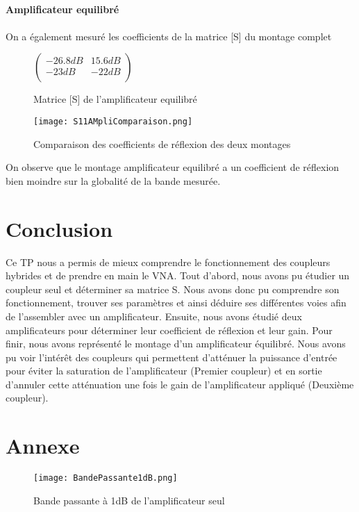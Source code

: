 \documentclass[oneside,a4paper,12pt]{article}
\begin{document}
	\paragraph{Amplificateur equilibré} \paragraph{}

	On a également mesuré les coefficients de la matrice [S] du montage complet
	
	\begin{figure}[h]
		\centering
		$
		\begin{pmatrix}
			-26.8 dB & 15.6 dB \\
			-23 dB & -22 dB \\
		\end{pmatrix}
		$
		\caption{Matrice [S] de l'amplificateur equilibré}
	\end{figure}

	\newpage
	\begin{figure}[h]
		\centering
		\texttt{[image: S11AMpliComparaison.png]}
		\caption{Comparaison des coefficients de réflexion des deux montages}
	\end{figure}

	On observe que le montage amplificateur equilibré a un coefficient de réflexion bien moindre sur la globalité de la bande mesurée.

	\newpage
	\section{Conclusion}
	Ce TP nous a permis de mieux comprendre le fonctionnement des coupleurs hybrides et de prendre en main le VNA. 
	Tout d’abord, nous avons pu étudier un coupleur seul et déterminer sa matrice S. 
	Nous avons donc pu comprendre son fonctionnement, trouver ses paramètres et ainsi déduire ses différentes voies afin de l’assembler avec un amplificateur. 
	Ensuite, nous avons étudié deux amplificateurs pour déterminer leur coefficient de réflexion et leur gain. 
	Pour finir, nous avons représenté le montage d’un amplificateur équilibré. 
	Nous avons pu voir l’intérêt des coupleurs qui permettent d’atténuer la puissance 
	d’entrée pour éviter la saturation de l’amplificateur (Premier coupleur) et en sortie d’annuler cette atténuation une fois le gain de l’amplificateur appliqué (Deuxième coupleur).
	
	\newpage
	\appendix
	\section{Annexe}

	\begin{figure}[h]
		\centering
		\texttt{[image: BandePassante1dB.png]}
		\caption{Bande passante à 1dB de l'amplificateur seul}
	\end{figure}
\end{document}
